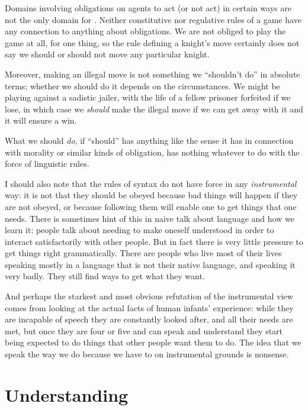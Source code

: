 \documentclass[output=paper]{langscibook}
\begin{document}
Domains involving obligations on agents to act (or not act) in certain ways are not the only domain for .  Neither constitutive nor regulative rules of a game have any connection to anything about obligations.  We are not obliged to play the game at all, for one thing, so the rule defining a knight's move certainly does not say we should or should not move any particular knight.

Moreover, making an illegal move is not something we ``shouldn't do'' in absolute terms; whether we should do it depends on the circumstances. We might be playing against a sadistic jailer, with the life of a fellow prisoner forfeited if we lose, in which case we \emph{should} make the illegal move if we can get away with it and it will ensure a win.

\largerpage[1]What we should \emph{do}, if ``should'' has anything like the sense it has in connection with morality or similar kinds of obligation, has nothing whatever to do with the  force of linguistic rules.

I should also note that the rules of syntax do not have  force in any \emph{instrumental} way: it is not that they should be obeyed because bad things will happen if they are not obeyed, or because following them will enable one to get things that one needs. There is sometimes hint of this in naive talk about language and how we learn it: people talk about needing to make oneself understood in order to interact satisfactorily with other people. But in fact there is very little pressure to get things right grammatically.  There are people who live most of their lives speaking mostly in a language that is not their native language, and speaking it very badly. They still find ways to get what they want.

And perhaps the starkest and most obvious refutation of the instrumental view comes from looking at the actual facts of human infants' experience: while they are incapable of speech they are constantly looked after, and all their needs are met, but once they are four or five and can speak and understand they start being expected to do things that other people want them to do. The idea that we speak the way we do because we have to on instrumental grounds is nonsense.

\section{Understanding}
\label{sec:pullum:understanding}
\end{document}
